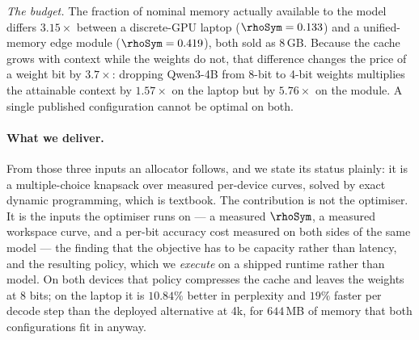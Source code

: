 \emph{The budget.} The fraction of nominal memory actually available to the
model differs $3.15\times$ between a discrete-GPU laptop ($\rhoSym=0.133$) and a
unified-memory edge module ($\rhoSym=0.419$), both sold as 8\,GB. Because the
cache grows with context while the weights do not, that difference changes the
price of a weight bit by $3.7\times$: dropping Qwen3-4B from 8-bit to 4-bit
weights multiplies the attainable context by $1.57\times$ on the laptop but by
$5.76\times$ on the module. A single published configuration cannot be optimal
on both.

\paragraph*{What we deliver.}
From those three inputs an allocator follows, and we state its status plainly:
it is a multiple-choice knapsack over measured per-device curves, solved by exact
dynamic programming, which is textbook. The contribution is not the optimiser.
It is the inputs the optimiser runs on --- a measured $\rhoSym$, a measured
workspace curve, and a per-bit accuracy cost measured on both sides of the same
model --- the finding that the objective has to be capacity rather than latency,
and the resulting policy, which we \emph{execute} on a shipped runtime rather
than model. On both devices that policy compresses the cache and leaves the
weights at 8 bits; on the laptop it is $10.84\%$ better in perplexity and $19\%$
faster per decode step than the deployed alternative at 4k, for $644$\,MB of
memory that both configurations fit in anyway.

